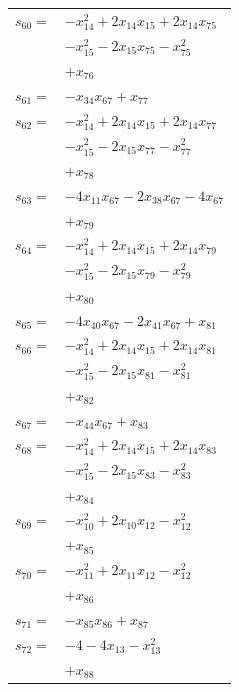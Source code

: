 \begin{longtable}{@{}r@{\;}l@{}}
\(s_{60}=\) & \(\displaystyle -x_{14}^{2} +2x_{14}x_{15} +2x_{14}x_{75}\) \\
 & \(\displaystyle -x_{15}^{2} -2x_{15}x_{75} -x_{75}^{2}\) \\
 & \(\displaystyle +x_{76}\) \\[3pt]
\(s_{61}=\) & \(\displaystyle -x_{34}x_{67} +x_{77}\) \\[3pt]
\(s_{62}=\) & \(\displaystyle -x_{14}^{2} +2x_{14}x_{15} +2x_{14}x_{77}\) \\
 & \(\displaystyle -x_{15}^{2} -2x_{15}x_{77} -x_{77}^{2}\) \\
 & \(\displaystyle +x_{78}\) \\[3pt]
\(s_{63}=\) & \(\displaystyle -4x_{11}x_{67} -2x_{38}x_{67} -4x_{67}\) \\
 & \(\displaystyle +x_{79}\) \\[3pt]
\(s_{64}=\) & \(\displaystyle -x_{14}^{2} +2x_{14}x_{15} +2x_{14}x_{79}\) \\
 & \(\displaystyle -x_{15}^{2} -2x_{15}x_{79} -x_{79}^{2}\) \\
 & \(\displaystyle +x_{80}\) \\[3pt]
\(s_{65}=\) & \(\displaystyle -4x_{40}x_{67} -2x_{41}x_{67} +x_{81}\) \\[3pt]
\(s_{66}=\) & \(\displaystyle -x_{14}^{2} +2x_{14}x_{15} +2x_{14}x_{81}\) \\
 & \(\displaystyle -x_{15}^{2} -2x_{15}x_{81} -x_{81}^{2}\) \\
 & \(\displaystyle +x_{82}\) \\[3pt]
\(s_{67}=\) & \(\displaystyle -x_{44}x_{67} +x_{83}\) \\[3pt]
\(s_{68}=\) & \(\displaystyle -x_{14}^{2} +2x_{14}x_{15} +2x_{14}x_{83}\) \\
 & \(\displaystyle -x_{15}^{2} -2x_{15}x_{83} -x_{83}^{2}\) \\
 & \(\displaystyle +x_{84}\) \\[3pt]
\(s_{69}=\) & \(\displaystyle -x_{10}^{2} +2x_{10}x_{12} -x_{12}^{2}\) \\
 & \(\displaystyle +x_{85}\) \\[3pt]
\(s_{70}=\) & \(\displaystyle -x_{11}^{2} +2x_{11}x_{12} -x_{12}^{2}\) \\
 & \(\displaystyle +x_{86}\) \\[3pt]
\(s_{71}=\) & \(\displaystyle -x_{85}x_{86} +x_{87}\) \\[3pt]
\(s_{72}=\) & \(\displaystyle -4 -4x_{13} -x_{13}^{2}\) \\
 & \(\displaystyle +x_{88}\) \\[3pt]

\end{longtable}
